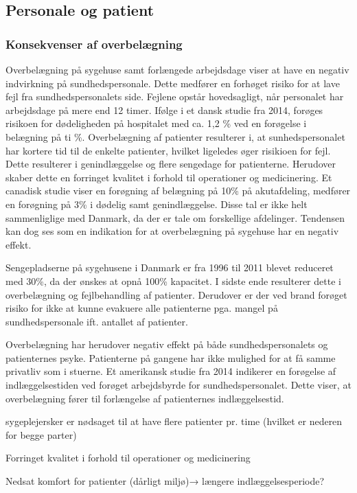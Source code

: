 \subsection{Personale og patient}

\subsubsection{Konsekvenser af overbelægning}

Overbelægning på sygehuse samt forlængede arbejdsdage viser at have en negativ indvirkning på sundhedspersonale. Dette medfører en forhøget risiko for at lave fejl fra sundhedspersonalets side. Fejlene opstår hovedsagligt, når personalet har arbejdsdage på mere end 12 timer.\citep{forogelse2004} Ifølge i et dansk studie fra 2014, forøges risikoen for dødeligheden på hospitalet med ca. 1,2 \% ved en forøgelse i belægning på ti \%.\citep{dodelighed2014} Overbelægning af patienter resulterer i, at sunhedspersonalet har kortere tid til de enkelte patienter, hvilket ligeledes øger risikioen for fejl. Dette resulterer i genindlæggelse og flere sengedage for patienterne. Herudover skaber dette en forringet kvalitet i forhold til operationer og medicinering. Et canadisk studie viser en forøgning af belægning på 10\% på akutafdeling, medfører en forøgning på 3\% i dødelig samt genindlæggelse.\citep{genind2014} Disse tal er ikke helt sammenliglige med Danmark, da der er tale om forskellige afdelinger. Tendensen kan dog ses som en indikation for at overbelægning på sygehuse har en negativ effekt.

Sengepladserne på sygehusene i Danmark er fra 1996 til 2011 blevet reduceret med 30\%, da der ønskes at opnå 100\% kapacitet.\citep{dodelighed2014} I sidste ende resulterer dette i overbelægning og fejlbehandling af patienter. Derudover er der ved brand forøget risiko for ikke at kunne evakuere alle patienterne pga. mangel på sundhedspersonale ift. antallet af patienter. 

Overbelægning har herudover negativ effekt på både sundhedspersonalets og patienternes psyke. Patienterne på gangene har ikke mulighed for at få samme privatliv som i stuerne. Et amerikansk studie fra 2014 indikerer en forøgelse af indlæggelsestiden ved forøget arbejdsbyrde for sundhedspersonalet\citep{forlang2014}. Dette viser, at overbelægning fører til forlængelse af patienternes indlæggelsestid. 


sygeplejersker er nødsaget til at have flere patienter pr. time (hvilket er nederen for begge parter)

Forringet kvalitet i forhold til operationer og medicinering 

Nedsat komfort for patienter (dårligt miljø)→ længere indlæggelsesperiode?
 